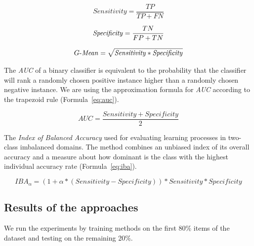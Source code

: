 \begin{equation} \label{eq:sensitivity}
\mathit{Sensitivity} = \frac{TP}{TP + FN}
\end{equation}

\begin{equation} \label{eq:specificity}
\mathit{Specificity} = \frac{TN}{FP + TN}\\
\end{equation}

\begin{equation} \label{eq:g-mean}
G{\text -}\mathit{Mean} = \sqrt{ \mathit{Sensitivity} * \mathit{Specificity}}
\end{equation}

The \textit{AUC} of a binary classifier is equivalent to the probability that the classifier will rank a randomly chosen positive instance higher than a randomly chosen negative instance. We are using the approximation formula for \textit{AUC} according to the trapezoid rule (Formula~\ref{eq:auc}).

\begin{equation} \label{eq:auc}
\mathit{AUC} = \frac{\mathit{Sensitivity} + \mathit{Specificity}}{2} 
\end{equation} 

The \textit{Index of Balanced Accuracy} used for evaluating learning processes in two-class imbalanced domains. The
method combines an unbiased index of its overall accuracy and a measure about
how dominant is the class with the highest individual accuracy rate (Formula~\ref{eq:iba}).

\begin{equation} \label{eq:iba}
\mathit{IBA_{\alpha}} = (1 + \alpha * (\mathit{Sensitivity} - \mathit{Specificity})) * \mathit{Sensitivity} * \mathit{Specificity}
\end{equation} 



\subsection{Results of the approaches}

We run the experiments by training methods on the first 80\% items of the dataset and testing on the remaining 20\%.


